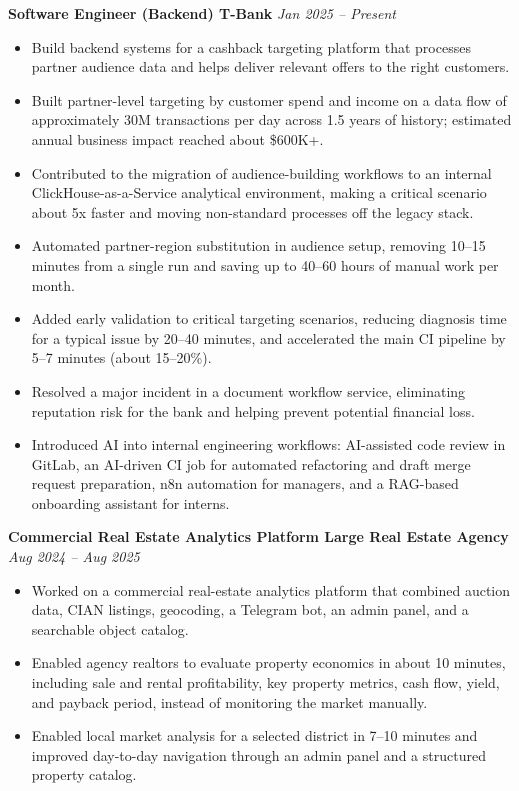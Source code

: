 \documentclass[10pt,a4paper]{article}
\begin{document}
\textbf{Software Engineer (Backend) \textbar{} T-Bank} \hfill \textit{Jan 2025 -- Present}
\begin{itemize}
  \item Build backend systems for a cashback targeting platform that processes partner audience data and helps deliver relevant offers to the right customers.
  \item Built partner-level targeting by customer spend and income on a data flow of approximately 30M transactions per day across 1.5 years of history; estimated annual business impact reached about \$600K+.
  \item Contributed to the migration of audience-building workflows to an internal ClickHouse-as-a-Service analytical environment, making a critical scenario about 5x faster and moving non-standard processes off the legacy stack.
  \item Automated partner-region substitution in audience setup, removing 10--15 minutes from a single run and saving up to 40--60 hours of manual work per month.
  \item Added early validation to critical targeting scenarios, reducing diagnosis time for a typical issue by 20--40 minutes, and accelerated the main CI pipeline by 5--7 minutes (about 15--20\%).
  \item Resolved a major incident in a document workflow service, eliminating reputation risk for the bank and helping prevent potential financial loss.
  \item Introduced AI into internal engineering workflows: AI-assisted code review in GitLab, an AI-driven CI job for automated refactoring and draft merge request preparation, n8n automation for managers, and a RAG-based onboarding assistant for interns.
\end{itemize}

\textbf{Commercial Real Estate Analytics Platform \textbar{} Large Real Estate Agency} \hfill \textit{Aug 2024 -- Aug 2025}
\begin{itemize}
  \item Worked on a commercial real-estate analytics platform that combined auction data, CIAN listings, geocoding, a Telegram bot, an admin panel, and a searchable object catalog.
  \item Enabled agency realtors to evaluate property economics in about 10 minutes, including sale and rental profitability, key property metrics, cash flow, yield, and payback period, instead of monitoring the market manually.
  \item Enabled local market analysis for a selected district in 7--10 minutes and improved day-to-day navigation through an admin panel and a structured property catalog.
\end{itemize}
\end{document}
